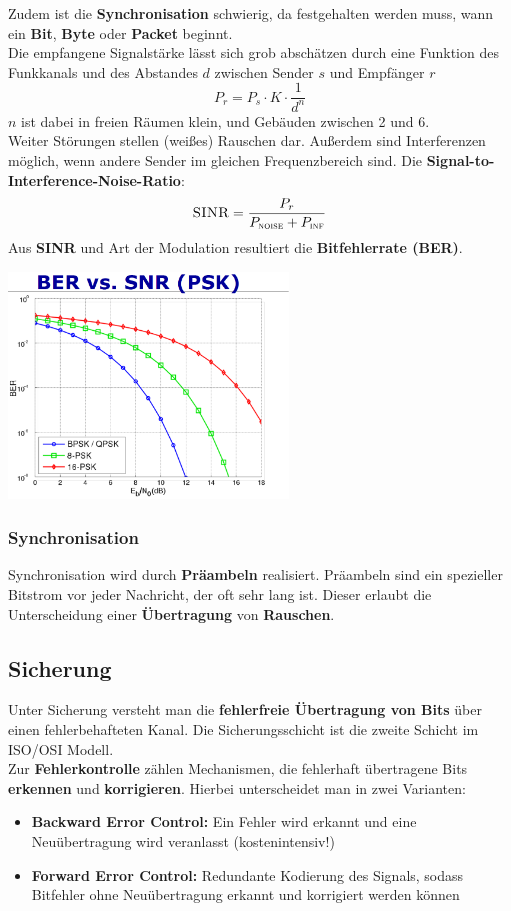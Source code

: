 \documentclass[a4paper]{article}
\begin{document}
Zudem ist die \textbf{Synchronisation} schwierig, da festgehalten werden muss, wann ein \textbf{Bit}, \textbf{Byte} oder \textbf{Packet} beginnt.\\

Die empfangene Signalstärke lässt sich grob abschätzen durch eine Funktion des Funkkanals und des Abstandes $d$ zwischen Sender $s$ und Empfänger $r$
$$P_r = P_s \cdot K \cdot \frac{1}{d^n}$$
$n$ ist dabei in freien Räumen klein, und Gebäuden zwischen 2 und 6.\\

Weiter Störungen stellen (weißes) Rauschen dar. Außerdem sind Interferenzen möglich, wenn andere Sender im gleichen Frequenzbereich sind. Die \textbf{Signal-to-Interference-Noise-Ratio}:
$$\textsc{SINR} = \dfrac{P_r}{P_{\textsc{noise}} + P_{\textsc{inf}}}$$
Aus \textbf{SINR} und Art der Modulation resultiert die \textbf{Bitfehlerrate (BER)}.
\begin{center}
	\includegraphics[height = 6cm]{BER-PSK.png}
\end{center}
\subsubsection{Synchronisation}
Synchronisation wird durch \textbf{Präambeln} realisiert. Präambeln sind ein spezieller Bitstrom vor jeder Nachricht, der oft sehr lang ist. Dieser erlaubt die Unterscheidung einer \textbf{Übertragung} von \textbf{Rauschen}.
	
\subsection{Sicherung}
Unter Sicherung versteht man die \textbf{fehlerfreie Übertragung von Bits} über einen fehlerbehafteten Kanal. Die Sicherungsschicht ist die zweite Schicht im ISO/OSI Modell.\\

Zur \textbf{Fehlerkontrolle} zählen Mechanismen, die fehlerhaft übertragene Bits \textbf{erkennen} und \textbf{korrigieren}. Hierbei unterscheidet man in zwei Varianten:
\begin{itemize}
	\item \textbf{Backward Error Control:} Ein Fehler wird erkannt und eine Neuübertragung wird veranlasst (kostenintensiv!)
	\item \textbf{Forward Error Control:} Redundante Kodierung des Signals, sodass Bitfehler ohne Neuübertragung erkannt und korrigiert werden können
\end{itemize}
\end{document}
